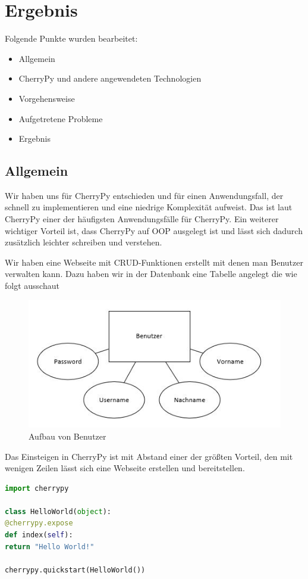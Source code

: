 
\section{Ergebnis}
\label{sec:Ergebnis}

Folgende Punkte wurden bearbeitet:


\begin{itemize}
	\item Allgemein
	\item CherryPy und andere angewendeten Technologien
	\item Vorgehensweise
	\item Aufgetretene Probleme	
	\item Ergebnis
\end{itemize}


\subsection{Allgemein}

Wir haben uns für CherryPy entschieden und für einen Anwendungsfall, der schnell zu implementieren und eine niedrige Komplexität aufweist. Das ist laut CherryPy einer der häufigsten Anwendungsfälle für CherryPy. Ein weiterer wichtiger Vorteil ist, dass CherryPy auf OOP ausgelegt ist und lässt sich dadurch zusätzlich leichter schreiben und verstehen.

Wir haben eine Webseite mit CRUD-Funktionen erstellt mit denen man Benutzer verwalten kann. 
Dazu haben wir in der Datenbank eine Tabelle angelegt die wie folgt ausschaut
\begin{figure}[!h]
\centering
\includegraphics[width=0.5\linewidth]{images/db}
\caption{Aufbau von Benutzer}
\label{fig:Benutzeraufbau}
\end{figure}


Das Einsteigen in CherryPy ist mit Abstand einer der größten Vorteil, den mit wenigen Zeilen lässt sich eine Webseite erstellen und bereitstellen.
\begin{lstlisting}[language=Python]
import cherrypy

class HelloWorld(object):
@cherrypy.expose
def index(self):
return "Hello World!"

cherrypy.quickstart(HelloWorld())
\end{lstlisting}

